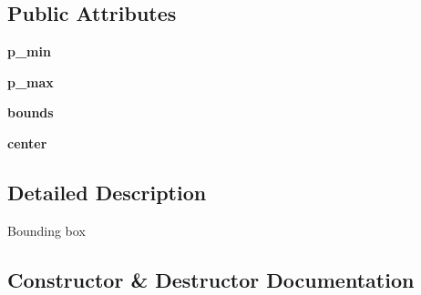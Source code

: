 \subsection*{Public Attributes}
\begin{DoxyCompactItemize}
\item 
{\bfseries p\+\_\+min}\hypertarget{classmeshy_1_1neuromorphovis_1_1bbox_1_1bounding__box_1_1BoundingBox_a181778588aa53a1e103d690d5282a1c2}{}\label{classmeshy_1_1neuromorphovis_1_1bbox_1_1bounding__box_1_1BoundingBox_a181778588aa53a1e103d690d5282a1c2}

\item 
{\bfseries p\+\_\+max}\hypertarget{classmeshy_1_1neuromorphovis_1_1bbox_1_1bounding__box_1_1BoundingBox_a47f4325f23c6718ef10b818bd1875749}{}\label{classmeshy_1_1neuromorphovis_1_1bbox_1_1bounding__box_1_1BoundingBox_a47f4325f23c6718ef10b818bd1875749}

\item 
{\bfseries bounds}\hypertarget{classmeshy_1_1neuromorphovis_1_1bbox_1_1bounding__box_1_1BoundingBox_a3ad98341267aa88c16238fb7af77eb36}{}\label{classmeshy_1_1neuromorphovis_1_1bbox_1_1bounding__box_1_1BoundingBox_a3ad98341267aa88c16238fb7af77eb36}

\item 
{\bfseries center}\hypertarget{classmeshy_1_1neuromorphovis_1_1bbox_1_1bounding__box_1_1BoundingBox_a31d56490111321865541fbe3a29a029a}{}\label{classmeshy_1_1neuromorphovis_1_1bbox_1_1bounding__box_1_1BoundingBox_a31d56490111321865541fbe3a29a029a}

\end{DoxyCompactItemize}


\subsection{Detailed Description}


\begin{DoxyVerb}Bounding box
\end{DoxyVerb}
 

\subsection{Constructor \& Destructor Documentation}

